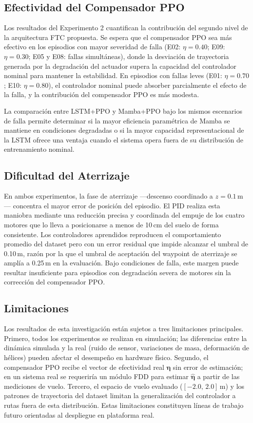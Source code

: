 \subsection{Efectividad del Compensador PPO}

Los resultados del Experimento 2 cuantifican la contribución del segundo nivel de la arquitectura FTC propuesta. Se espera que el compensador PPO sea más efectivo en los episodios con mayor severidad de falla (E02: $\eta=0.40$; E09: $\eta=0.30$; E05 y E08: fallas simultáneas), donde la desviación de trayectoria generada por la degradación del actuador supera la capacidad del controlador nominal para mantener la estabilidad. En episodios con fallas leves (E01: $\eta=0.70$; E10: $\eta=0.80$), el controlador nominal puede absorber parcialmente el efecto de la falla, y la contribución del compensador PPO es más modesta.

La comparación entre LSTM+PPO y Mamba+PPO bajo los mismos escenarios de falla permite determinar si la mayor eficiencia paramétrica de Mamba se mantiene en condiciones degradadas o si la mayor capacidad representacional de la LSTM ofrece una ventaja cuando el sistema opera fuera de su distribución de entrenamiento nominal.

\subsection{Dificultad del Aterrizaje}

En ambos experimentos, la fase de aterrizaje —descenso coordinado a $z=0.1$\,m— concentra el mayor error de posición del episodio. El PID realiza esta maniobra mediante una reducción precisa y coordinada del empuje de los cuatro motores que lo lleva a posicionarse a menos de 10\,cm del suelo de forma consistente. Los controladores aprendidos reproducen el comportamiento promedio del dataset pero con un error residual que impide alcanzar el umbral de 0.10\,m, razón por la que el umbral de aceptación del waypoint de aterrizaje se amplía a 0.25\,m en la evaluación. Bajo condiciones de falla, este margen puede resultar insuficiente para episodios con degradación severa de motores sin la corrección del compensador PPO.

\subsection{Limitaciones}

Los resultados de esta investigación están sujetos a tres limitaciones principales. Primero, todos los experimentos se realizan en simulación; las diferencias entre la dinámica simulada y la real (ruido de sensor, variaciones de masa, deformación de hélices) pueden afectar el desempeño en hardware físico. Segundo, el compensador PPO recibe el vector de efectividad real $\boldsymbol{\eta}$ sin error de estimación; en un sistema real se requeriría un módulo FDD para estimar $\hat{\boldsymbol{\eta}}$ a partir de las mediciones de vuelo. Tercero, el espacio de vuelo evaluado ($[-2.0,\,2.0]$\,m) y los patrones de trayectoria del dataset limitan la generalización del controlador a rutas fuera de esta distribución. Estas limitaciones constituyen líneas de trabajo futuro orientadas al despliegue en plataforma real.
